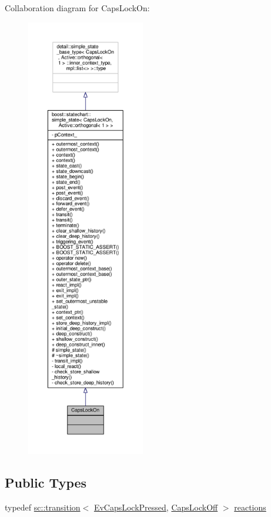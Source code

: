 Collaboration diagram for Caps\+Lock\+On\+:
\nopagebreak
\begin{figure}[H]
\begin{center}
\leavevmode
\includegraphics[height=550pt]{struct_caps_lock_on__coll__graph}
\end{center}
\end{figure}
\subsection*{Public Types}
\begin{DoxyCompactItemize}
\item 
typedef \mbox{\hyperlink{classboost_1_1statechart_1_1transition}{sc\+::transition}}$<$ \mbox{\hyperlink{struct_ev_caps_lock_pressed}{Ev\+Caps\+Lock\+Pressed}}, \mbox{\hyperlink{struct_caps_lock_off}{Caps\+Lock\+Off}} $>$ \mbox{\hyperlink{struct_caps_lock_on_a86c554b888ebff198c4b8d4ba48b5728}{reactions}}
\end{DoxyCompactItemize}
